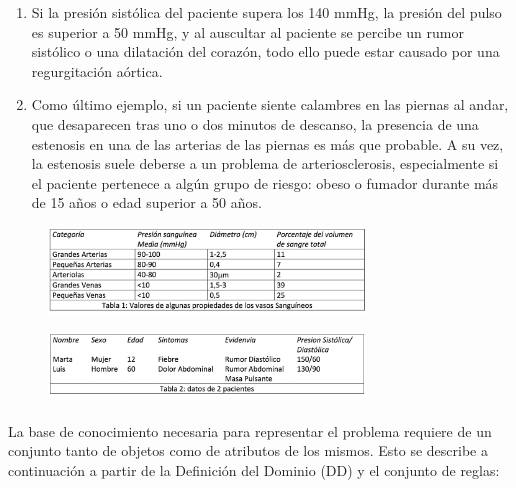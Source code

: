 \documentclass[10pt, a4paper,spanish]{article}
\begin{document}
\begin{enumerate}
			\item Si la presión sistólica del paciente supera los 140 mmHg, la presión del pulso es superior a 50 mmHg, y al auscultar al paciente se percibe un rumor sistólico o una dilatación del corazón, todo ello puede estar causado por una regurgitación aórtica.

			\item Como último ejemplo, si un paciente siente calambres en las piernas al andar, que desaparecen tras uno o dos minutos de descanso, la presencia de una estenosis en una de las arterias de las piernas es más que probable. A su vez, la estenosis suele deberse a un problema de arteriosclerosis, especialmente si el paciente pertenece a algún grupo de riesgo: obeso o fumador durante más de 15 años o edad superior a 50 años.

		\end{enumerate}

		\begin{figure}[H]
			\begin{center}
				\includegraphics[width=0.75\textwidth]{table-1}
			\end{center}
		\end{figure}

		\begin{figure}[H]
			\begin{center}
				\includegraphics[width=0.75\textwidth]{table-2}
			\end{center}
		\end{figure}

		\paragraph{}
		La base de conocimiento necesaria para representar el problema requiere de un conjunto tanto de objetos como de atributos de los mismos. Esto se describe a continuación a partir de la Definición del Dominio (DD) y el conjunto de reglas:
\end{document}

